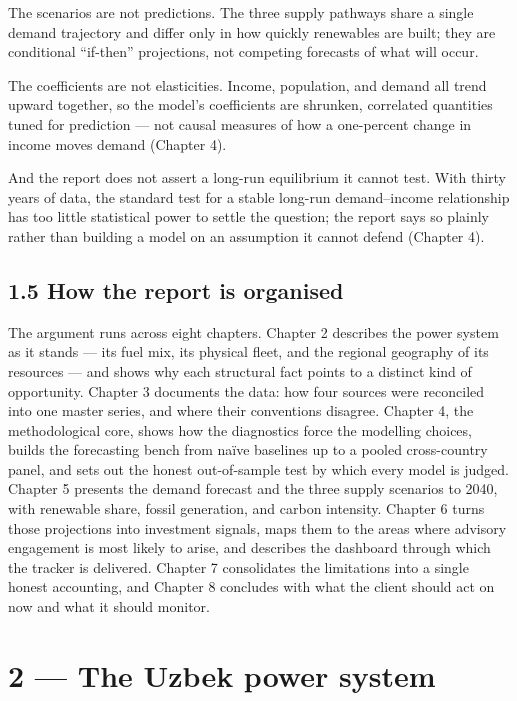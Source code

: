 \documentclass[10pt,twocolumn]{article}
\begin{document}
The scenarios are not predictions. The three supply pathways share a single demand trajectory and differ only in how quickly renewables are built; they are conditional ``if-then'' projections, not competing forecasts of what will occur.

The coefficients are not elasticities. Income, population, and demand all trend upward together, so the model's coefficients are shrunken, correlated quantities tuned for prediction --- not causal measures of how a one-percent change in income moves demand (Chapter 4).

And the report does not assert a long-run equilibrium it cannot test. With thirty years of data, the standard test for a stable long-run demand--income relationship has too little statistical power to settle the question; the report says so plainly rather than building a model on an assumption it cannot defend (Chapter 4).

\subsection*{1.5 How the report is organised}

The argument runs across eight chapters. Chapter 2 describes the power system as it stands --- its fuel mix, its physical fleet, and the regional geography of its resources --- and shows why each structural fact points to a distinct kind of opportunity. Chapter 3 documents the data: how four sources were reconciled into one master series, and where their conventions disagree. Chapter 4, the methodological core, shows how the diagnostics force the modelling choices, builds the forecasting bench from naïve baselines up to a pooled cross-country panel, and sets out the honest out-of-sample test by which every model is judged. Chapter 5 presents the demand forecast and the three supply scenarios to 2040, with renewable share, fossil generation, and carbon intensity. Chapter 6 turns those projections into investment signals, maps them to the areas where advisory engagement is most likely to arise, and describes the dashboard through which the tracker is delivered. Chapter 7 consolidates the limitations into a single honest accounting, and Chapter 8 concludes with what the client should act on now and what it should monitor.

\section*{2 --- The Uzbek power system}
\end{document}

